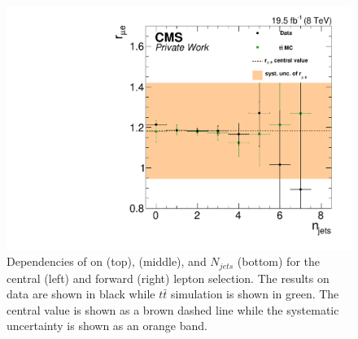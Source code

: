\begin{figure}[htbp]
\begin{minipage}[t]{0.49\textwidth}
\includegraphics[width=\textwidth]{plots/BG/rmue/rMuE_ZPeakControlForward_Full2012_NJets_None.pdf}
\end{minipage}
\caption{Dependencies of \rmue on \mll (top), \MET (middle), and $N_{jets}$ (bottom) for the central (left) and forward (right) lepton selection. The results on data are shown in black while $t\bar{t}$ simulation is shown in green. The central value is shown as a brown dashed line while the systematic uncertainty is shown as an orange band.}
\label{fig:rmueDependencies}
\end{figure} 
